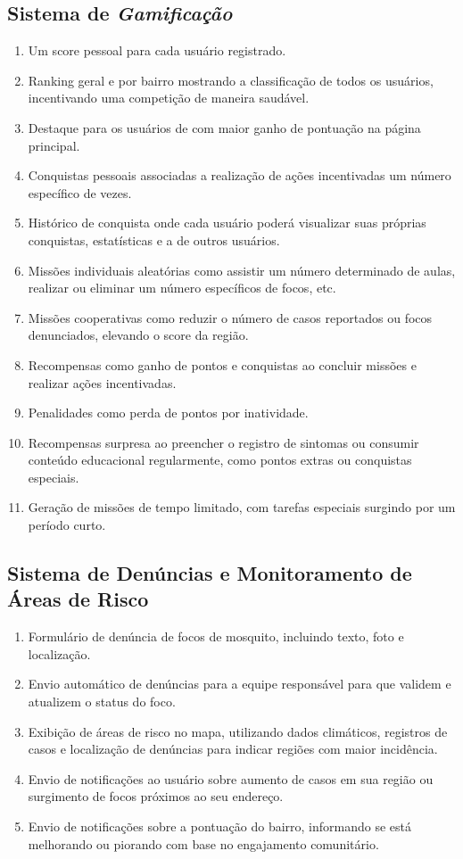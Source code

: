 \documentclass[a4paper, 12pt]{article}
\begin{document}
\subsection{Sistema de \textit{Gamificação}}
\begin{enumerate}
    \item Um score pessoal para cada usuário registrado.
    \item Ranking geral e por bairro mostrando a classificação de todos os usuários, incentivando uma competição de maneira saudável.
    \item Destaque para os usuários de com maior ganho de pontuação na página principal.
    \item Conquistas pessoais associadas a realização de ações incentivadas um número específico de vezes.
    \item Histórico de conquista onde cada usuário poderá visualizar suas próprias conquistas, estatísticas e a de outros usuários.
    \item Missões individuais aleatórias como assistir um número determinado de aulas, realizar ou eliminar um número específicos de focos, etc.
    \item Missões cooperativas como reduzir o número de casos reportados ou focos denunciados, elevando o score da região.
    \item Recompensas como ganho de pontos e conquistas ao concluir missões e realizar ações incentivadas.
    \item Penalidades como perda de pontos por inatividade.
    \item Recompensas surpresa ao preencher o registro de sintomas ou consumir conteúdo educacional regularmente, como pontos extras ou conquistas especiais.
    \item Geração de missões de tempo limitado, com tarefas especiais surgindo por um período curto.
\end{enumerate}

\subsection{Sistema de Denúncias e Monitoramento de Áreas de Risco}
\begin{enumerate}
    \item Formulário de denúncia de focos de mosquito, incluindo texto, foto e localização.
    \item Envio automático de denúncias para a equipe responsável para que validem e atualizem o status do foco. 
    \item Exibição de áreas de risco no mapa, utilizando dados climáticos, registros de casos e localização de denúncias para indicar regiões com maior incidência.
    \item Envio de notificações ao usuário sobre aumento de casos em sua região ou surgimento de focos próximos ao seu endereço.
    \item Envio de notificações sobre a pontuação do bairro, informando se está melhorando ou piorando com base no engajamento comunitário.
\end{enumerate}
\end{document}
